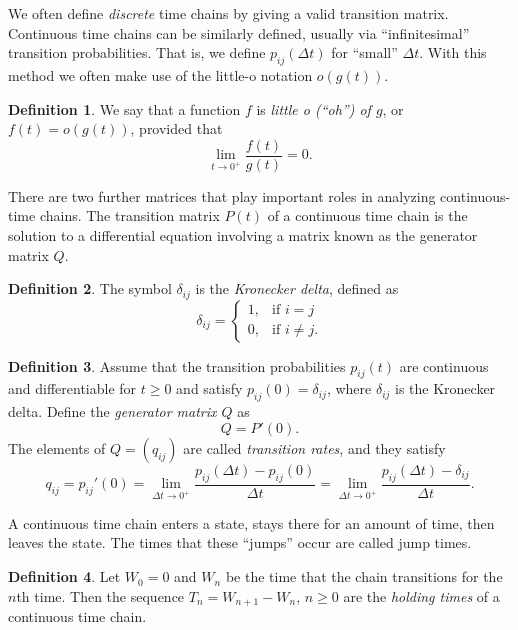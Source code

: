 \documentclass[12pt]{article}
\theoremstyle{definition}
\newtheorem{defn}{Definition}
\begin{document}
We often define \emph{discrete} time chains by giving a valid transition
matrix. Continuous time chains can be similarly defined, usually via
``infinitesimal'' transition probabilities. That is, we define $p_{ij}(\Delta
t)$ for ``small'' $\Delta t$. With this method we often make use of the
little-o notation $o(g(t))$.

\begin{defn}
    \label{defn:order-notation}
    We say that a function $f$ is \emph{little o (``oh'') of $g$}, or $f(t) =
    o(g(t))$, provided that
    \[
        \lim_{t \to 0^+} \frac{f(t)}{g(t)} = 0.
    \]
\end{defn}

There are two further matrices that play important roles in analyzing
continuous-time chains. The transition matrix $P(t)$ of a continuous time chain
is the solution to a differential equation involving a matrix known as the
generator matrix $Q$.

\begin{defn}
    \label{defn:kronecker-delta}
    The symbol $\delta_{ij}$ is the \emph{Kronecker delta}, defined as
    \[
        \delta_{ij} =
        \begin{cases}
            1, & \text{if } i = j \\
            0, & \text{if } i \neq j.
        \end{cases}
    \]
\end{defn}

\begin{defn}
    \label{defn:transition-rates}
    Assume that the transition probabilities $p_{ij}(t)$ are continuous and
    differentiable for $t \geq 0$ and satisfy $p_{ij}(0) = \delta_{ij}$, where
    $\delta_{ij}$ is the Kronecker delta. Define the \emph{generator matrix
    $Q$} as $$Q = P'(0).$$ The elements of $Q = (q_{ij})$ are called
    \emph{transition rates}, and they satisfy
    \[
        q_{ij} = p_{ij}'(0) = \lim_{\Delta t \to 0^+} \frac{p_{ij}(\Delta t) -
        p_{ij}(0)}{\Delta t} = \lim_{\Delta t \to 0^+} \frac{p_{ij}(\Delta t) -
        \delta_{ij}}{\Delta t}.
    \]
\end{defn}

A continuous time chain enters a state, stays there for an amount of time, then
leaves the state. The times that these ``jumps'' occur are called jump times.

\begin{defn}
    \label{defn:holding-time}
    Let $W_0 = 0$ and $W_n$ be the time that the chain transitions for the
    $n$th time. Then the sequence $T_n = W_{n + 1} - W_n$, $n \geq 0$ are the
    \emph{holding times} of a continuous time chain.
\end{defn}
\end{document}
